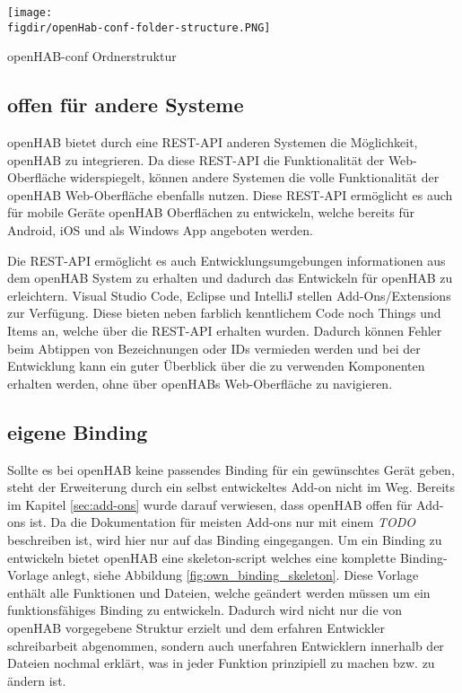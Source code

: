 {
	\centering
	\captionsetup{type=figure}
	\texttt{[image: \\figdir/openHab-conf-folder-structure.PNG]}
	\caption{openHAB-conf Ordnerstruktur \label{fig:openHab-conf-folder-structure}}
}

\subsection{offen für andere Systeme}
openHAB bietet durch eine REST-API anderen Systemen die Möglichkeit, openHAB zu integrieren. Da diese REST-API die Funktionalität der Web-Oberfläche widerspiegelt, können andere Systemen die volle Funktionalität der openHAB Web-Oberfläche ebenfalls nutzen. Diese REST-API ermöglicht es auch für mobile Geräte openHAB Oberflächen zu entwickeln, welche bereits für Android, iOS und als Windows App angeboten werden.

Die REST-API ermöglicht es auch Entwicklungsumgebungen informationen aus dem openHAB System zu erhalten und dadurch das Entwickeln für openHAB zu erleichtern. Visual Studio Code, Eclipse und IntelliJ stellen Add-Ons/Extensions zur Verfügung. Diese bieten neben farblich kenntlichem Code noch Things und Items an, welche über die REST-API erhalten wurden. Dadurch können Fehler beim Abtippen von Bezeichnungen oder IDs vermieden werden und bei der Entwicklung kann ein guter Überblick über die zu verwenden Komponenten erhalten werden, ohne über openHABs Web-Oberfläche zu navigieren.

\subsection{eigene Binding}
Sollte es bei openHAB keine passendes Binding für ein gewünschtes Gerät geben, steht der Erweiterung durch ein selbst entwickeltes Add-on nicht im Weg. Bereits im Kapitel \ref{sec:add-ons} wurde darauf verwiesen, dass openHAB offen für Add-ons ist. Da die Dokumentation für meisten Add-ons nur mit einem \textit{TODO} beschreiben ist, wird hier nur auf das Binding eingegangen.
Um ein Binding zu entwickeln bietet openHAB eine skeleton-script welches eine komplette Binding-Vorlage anlegt, siehe Abbildung \ref{fig:own_binding_skeleton}. Diese Vorlage enthält alle Funktionen und Dateien, welche geändert werden müssen um ein funktionsfähiges Binding zu entwickeln. Dadurch wird nicht nur die von openHAB vorgegebene Struktur erzielt und dem erfahren Entwickler schreibarbeit abgenommen, sondern auch unerfahren Entwicklern innerhalb der Dateien nochmal erklärt, was in jeder Funktion prinzipiell zu machen bzw. zu ändern ist.

